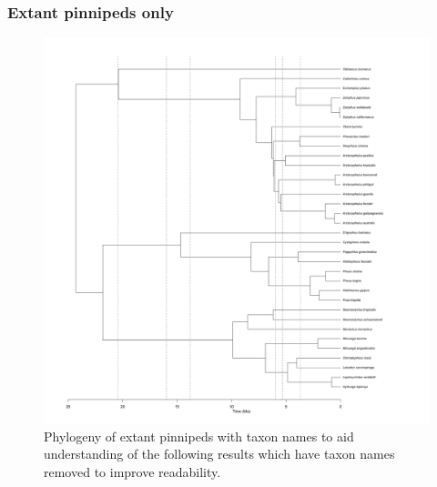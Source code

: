 \documentclass[a4paper, 12pt]{article}
\begin{document}
\subsubsection{Extant pinnipeds only}

\begin{figure}[H]
 \centering
  \includegraphics[width = \linewidth]{figures/extant-pinnipeds-tree.png}
  \caption{Phylogeny of extant pinnipeds with taxon names to aid understanding of the following results which have taxon names removed to improve readability.}
  \label{fig-extant-tree}
\end{figure} 
\end{document}
